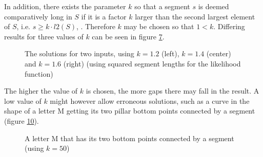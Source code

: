 \documentclass[11pt]{article}
\begin{document}
In addition, there exists the parameter $k$ so that a segment $s$ is deemed comparatively long in $S$ if it is a factor $k$ larger than the second largest element of $S$, i.e. $s \geq k \cdot l2(S)$, . Therefore $k$ may be chosen so that $1 < k$. Differing results for three values of $k$ can be seen in figure \ref{fig:exp:single_parameter_b}.

\begingroup
{}%
\begin{figure}[ht!]
\centering
\begin{subfigure}{.16\linewidth}
\centering

\label{fig:exp:single_parameter_b:first}
\end{subfigure}%
\begin{subfigure}{.16\linewidth}
\centering

\label{fig:exp:single_parameter_b:second}
\centering
\end{subfigure}
\begin{subfigure}{.16\linewidth}
\centering

\label{fig:exp:single_parameter_b:third}
\end{subfigure}%
\begin{subfigure}{.16\linewidth}
\centering

\label{fig:exp:single_parameter_b:fourth}
\centering
\end{subfigure}
\begin{subfigure}{.16\linewidth}
\centering

\label{fig:exp:single_parameter_b:fifth}
\end{subfigure}%
\begin{subfigure}{.16\linewidth}
\centering

\label{fig:exp:single_parameter_b:sixth}
\centering
\end{subfigure}
\caption{The solutions for two inputs, using $k = 1.2$ (left), $k = 1.4$ (center) and $k = 1.6$ (right) (using squared segment lengths for the likelihood function)}
\label{fig:exp:single_parameter_b}
\end{figure}
\endgroup

The higher the value of $k$ is chosen, the more gaps there may fall in the result. A low value of $k$ might however allow erroneous solutions, such as a curve in the shape of a letter M getting its two pillar bottom points connected by a segment (figure \ref{fig:exp:single_parameter_c}).

\begingroup
{}%
\begin{figure}[ht!]
\begin{subfigure}{.5\linewidth}
\centering

\label{fig:exp:single_parameter_c:first}
\end{subfigure}%
\begin{subfigure}{.5\linewidth}
\centering

\label{fig:exp:single_parameter_c:second}
\end{subfigure}%
\caption{A letter M that has its two bottom points connected by a segment (using $k = 50$)}
\label{fig:exp:single_parameter_c}
\end{figure}
\endgroup
\end{document}
